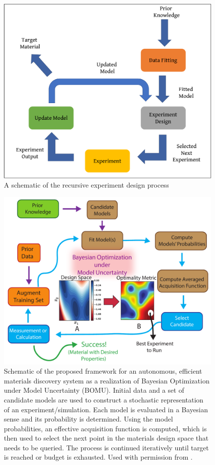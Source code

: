 \documentclass[utf8]{frontiersSCNS} %
\begin{document}
\begin{figure}[!]
\centering
\includegraphics[scale=0.3]{./figures/experiment_design}
\caption{A schematic of the recursive experiment design process}
\label{fig:01}
\end{figure}

\begin{figure}[!]
\centering
\includegraphics[scale=0.5]{./figures/BOMU}
\caption{Schematic of the proposed framework for an autonomous, efficient materials discovery system as a realization of Bayesian Optimization under Model Uncertainty (BOMU). Initial data and a set of candidate models are used to construct a stochastic representation of an experiment/simulation. Each model is evaluated in a Bayesian sense and its probability is determined. Using the model probabilities, an effective acquisition function is computed, which is then used to select the next point in the materials design space that needs to be queried. The process is continued iteratively until target is reached or budget is exhausted. Used with permission from \cite{talapatra2018autonomous}.}
\label{fig:02}
\end{figure}
\end{document}
